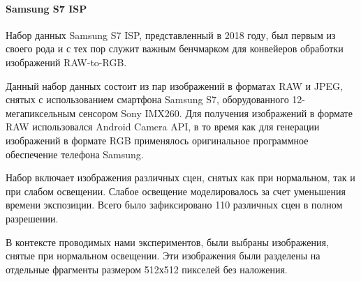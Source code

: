 \paragraph{Samsung S7 ISP}

Набор данных Samsung S7 ISP, представленный в 2018 году, был первым из своего рода и с тех пор служит важным бенчмарком для конвейеров обработки изображений RAW-to-RGB.

Данный набор данных состоит из пар изображений в форматах RAW и JPEG, снятых с использованием смартфона Samsung S7, оборудованного 12-мегапиксельным сенсором Sony IMX260. Для получения изображений в формате RAW использовался Android Camera API, в то время как для генерации изображений в формате RGB применялось оригинальное программное обеспечение телефона Samsung.

Набор включает изображения различных сцен, снятых как при нормальном, так и при слабом освещении. Слабое освещение моделировалось за счет уменьшения времени экспозиции. Всего было зафиксировано 110 различных сцен в полном разрешении.

В контексте проводимых нами экспериментов, были выбраны изображения, снятые при нормальном освещении. Эти изображения были разделены на отдельные фрагменты размером 512х512 пикселей без наложения.